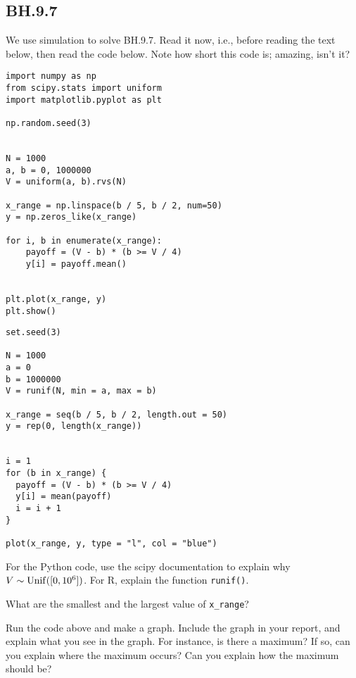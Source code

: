 \subsection{BH.9.7}
\label{sec:bh.9.7}

We use  simulation to solve  BH.9.7.
Read it now, i.e., before reading the text below, then read the code below.
Note how short  this code is;  amazing, isn't it?



\begin{verbatim}
import numpy as np
from scipy.stats import uniform
import matplotlib.pyplot as plt

np.random.seed(3)


N = 1000
a, b = 0, 1000000
V = uniform(a, b).rvs(N)

x_range = np.linspace(b / 5, b / 2, num=50)
y = np.zeros_like(x_range)

for i, b in enumerate(x_range):
    payoff = (V - b) * (b >= V / 4)
    y[i] = payoff.mean()


plt.plot(x_range, y)
plt.show()
\end{verbatim}

\begin{verbatim}
set.seed(3)

N = 1000
a = 0
b = 1000000
V = runif(N, min = a, max = b)

x_range = seq(b / 5, b / 2, length.out = 50)
y = rep(0, length(x_range))


i = 1
for (b in x_range) {
  payoff = (V - b) * (b >= V / 4)
  y[i] = mean(payoff)
  i = i + 1
}

plot(x_range, y, type = "l", col = "blue")
\end{verbatim}


\begin{exercise}
For the Python code, use the scipy documentation to explain why $V\sim\mathrm{Unif}([0,10^{6}])$. For R, explain the function \texttt{runif()}.
\end{exercise}



\begin{exercise}
What are the smallest and the largest value of \verb|x_range|?
\end{exercise}

\begin{exercise}
Run the code above and make a graph. Include the graph in your report, and explain what you see in the graph. For instance, is there a maximum? If so, can you explain where the maximum occurs? Can you explain how the maximum should be?
\end{exercise}


